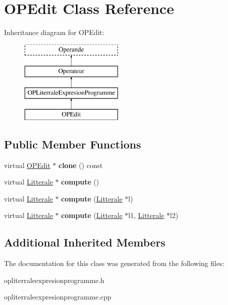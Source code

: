 \hypertarget{class_o_p_edit}{}\section{O\+P\+Edit Class Reference}
\label{class_o_p_edit}
Inheritance diagram for O\+P\+Edit\+:\begin{figure}[H]
\begin{center}
\leavevmode
\includegraphics[height=4.000000cm]{class_o_p_edit}
\end{center}
\end{figure}
\subsection*{Public Member Functions}
\begin{DoxyCompactItemize}
\item 
virtual \hyperlink{class_o_p_edit}{O\+P\+Edit} $\ast$ {\bfseries clone} () const \hypertarget{class_o_p_edit_ab70b709ea9b4281651583632e0e84456}{}\label{class_o_p_edit_ab70b709ea9b4281651583632e0e84456}

\item 
virtual \hyperlink{class_litterale}{Litterale} $\ast$ {\bfseries compute} ()\hypertarget{class_o_p_edit_a9eb95efcb93c180eb1436d327be5c136}{}\label{class_o_p_edit_a9eb95efcb93c180eb1436d327be5c136}

\item 
virtual \hyperlink{class_litterale}{Litterale} $\ast$ {\bfseries compute} (\hyperlink{class_litterale}{Litterale} $\ast$l)\hypertarget{class_o_p_edit_a21615280952f453fcf586711591f6e97}{}\label{class_o_p_edit_a21615280952f453fcf586711591f6e97}

\item 
virtual \hyperlink{class_litterale}{Litterale} $\ast$ {\bfseries compute} (\hyperlink{class_litterale}{Litterale} $\ast$l1, \hyperlink{class_litterale}{Litterale} $\ast$l2)\hypertarget{class_o_p_edit_aaa16d6e4a144f1a881eb61770ca6ec03}{}\label{class_o_p_edit_aaa16d6e4a144f1a881eb61770ca6ec03}

\end{DoxyCompactItemize}
\subsection*{Additional Inherited Members}


The documentation for this class was generated from the following files\+:\begin{DoxyCompactItemize}
\item 
opliterraleexpresionprogramme.\+h\item 
opliterraleexpresionprogramme.\+cpp\end{DoxyCompactItemize}
